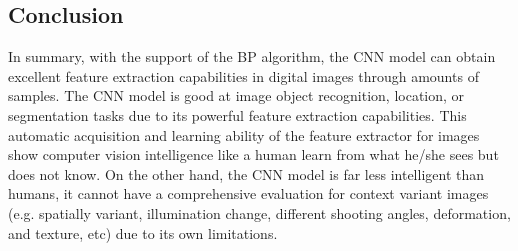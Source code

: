 \documentclass[10pt, a4paper]{article}
\begin{document}
\begin{multicols}{2}
	\section{Conclusion} \justify
	In summary, with the support of the BP algorithm, the CNN model can obtain excellent feature extraction capabilities in digital images through amounts of samples. The CNN model is good at image object recognition, location, or segmentation tasks due to its powerful feature extraction capabilities. This automatic acquisition and learning ability of the feature extractor for images show computer vision intelligence like a human learn from what he/she sees but does not know. On the other hand, the CNN model is far less intelligent than humans, it cannot have a comprehensive evaluation for context variant images (e.g. spatially variant, illumination change, different shooting angles, deformation, and texture, etc) due to its own limitations. 


	\printbibliography %

%	
%	       
% 	
%	
%  	
% 	
% 	
%	
%  


	\end{multicols}
\end{document}
